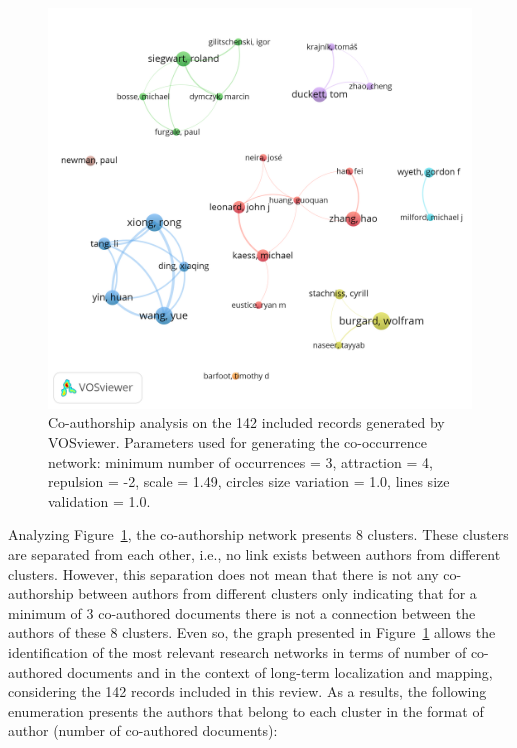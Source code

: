 \begin{figure}[h]
  \centering
  \includegraphics[width=\columnwidth]{figures/authors.png}
  \caption{Co-authorship analysis on the 142 included records generated by VOSviewer. Parameters used for generating the co-occurrence network: minimum number of occurrences = 3, attraction = 4, repulsion = -2, scale = 1.49, circles size variation = 1.0, lines size validation = 1.0.}
  \label{fig:overview:authors}
\end{figure}

Analyzing Figure~\ref{fig:overview:authors}, the co-authorship network presents 8 clusters. These clusters are separated from each other, i.e., no link exists between authors from different clusters. However, this separation does not mean that there is not any co-authorship between authors from different clusters only indicating that for a minimum of 3 co-authored documents there is not a connection between the authors of these 8 clusters. Even so, the graph presented in Figure~\ref{fig:overview:authors} allows the identification of the most relevant research networks in terms of number of co-authored documents and in the context of long-term localization and mapping, considering the 142 records included in this review. As a results, the following enumeration presents the authors that belong to each cluster in the format of author (number of co-authored documents):


